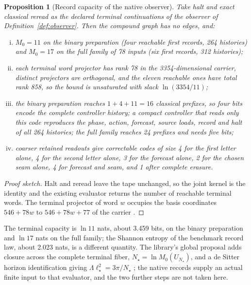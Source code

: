 \documentclass[11pt]{article}
\newtheorem{proposition}[theorem]{Proposition}
\theoremstyle{definition}
\theoremstyle{remark}
\theoremstyle{plain}
\begin{document}
\begin{proposition}[Record capacity of the native observer]
\label{prop:capacity}
Take halt and exact classical reread as the declared terminal continuations
of the observer of Definition~\ref{def:observer}. Then the compound graph
has no edges, and:
\begin{enumerate}[(i)]
\item $M_0=11$ on the binary preparation (four reachable first records, 264
histories) and $M_0=17$ on the full family of 78 inputs (six first records,
312 histories);
\item each terminal word projector has rank 78 in the 3354-dimensional
carrier, distinct projectors are orthogonal, and the eleven reachable ones
have total rank 858, so the bound is unsaturated with slack $\ln(3354/11)$;
\item the binary preparation reaches $1+4+11=16$ classical prefixes, so four
bits encode the complete controller history; a compact controller that reads
only this code reproduces the phase, action, forecast, source loads, record
and halt of all 264 histories; the full family reaches 24 prefixes and needs
five bits;
\item coarser retained readouts give correctable codes of size 4 for the
first letter alone, 4 for the second letter alone, 3 for the forecast alone,
2 for the chosen seam alone, 4 for forecast and seam, and 1 after complete
erasure.
\end{enumerate}
\end{proposition}

\begin{proof}[Proof sketch]
Halt and reread leave the tape unchanged, so the joint kernel is the
identity and the existing evaluator returns the number of reachable terminal
words. The terminal projector of word $w$ occupies the basis coordinates
$546+78w$ to $546+78w+77$ of the carrier \cite{oCAP,rCAP}.
\end{proof}

The terminal capacity is $\ln 11$ nats, about 3.459 bits, on the binary
preparation and $\ln 17$ nats on the full family; the Shannon entropy of the
benchmark record law, about 2.023 nats, is a different quantity. The
library's global proposal adds closure across the complete terminal fiber,
$N_\star=\ln M_0(U_{N_\star})$, and a de Sitter horizon identification giving
$\Lambda\ell_\star^2=3\pi/N_\star$ \cite{ophobservers,oCAP}; the native records
supply an actual finite input to that evaluator, and the two further steps
are not taken here.
\end{document}

